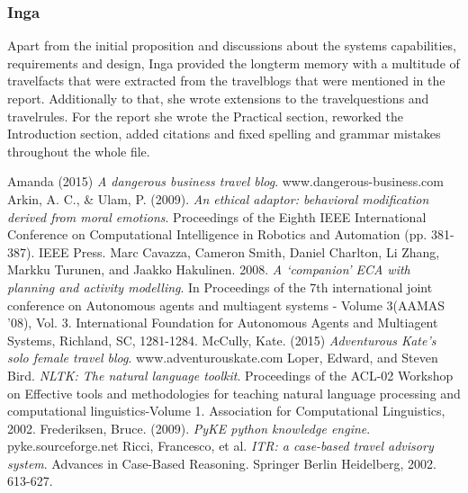 \documentclass[11pt]{article} %
\begin{document}
\subsubsection{Inga}
Apart from the initial proposition and discussions about the systems capabilities, requirements and design, Inga provided the longterm memory with a multitude of travelfacts that were extracted from the travelblogs that were mentioned in the report. 
Additionally to that, she wrote extensions to the travelquestions and travelrules. 
For the report she wrote the Practical section, reworked the Introduction section, added citations and fixed spelling and grammar mistakes throughout the whole file.

\begin{thebibliography}{9}

Amanda (2015) \emph{A dangerous business travel blog}. www.dangerous-business.com
Arkin, A. C., \& Ulam, P. (2009). \emph{An ethical adaptor: behavioral modification derived from moral emotions}. Proceedings of the Eighth IEEE International Conference on Computational Intelligence in Robotics and Automation (pp. 381-387). IEEE Press.
Marc Cavazza, Cameron Smith, Daniel Charlton, Li Zhang, Markku Turunen, and Jaakko Hakulinen. 2008. \emph{A `companion' ECA with planning and activity modelling}. In Proceedings of the 7th international joint conference on Autonomous agents and multiagent systems - Volume 3(AAMAS '08), Vol. 3. International Foundation for Autonomous Agents and Multiagent Systems, Richland, SC, 1281-1284.
McCully, Kate. (2015) \emph{Adventurous Kate's solo female travel blog}. www.adventurouskate.com
Loper, Edward, and Steven Bird. \emph{NLTK: The natural language toolkit}. Proceedings of the ACL-02 Workshop on Effective tools and methodologies for teaching natural language processing and computational linguistics-Volume 1. Association for Computational Linguistics, 2002.
Frederiksen, Bruce. (2009). \emph{PyKE python knowledge engine}. pyke.sourceforge.net
Ricci, Francesco, et al. \emph{ITR: a case-based travel advisory system}. Advances in Case-Based Reasoning. Springer Berlin Heidelberg, 2002. 613-627.


\end{thebibliography}
\end{document}
